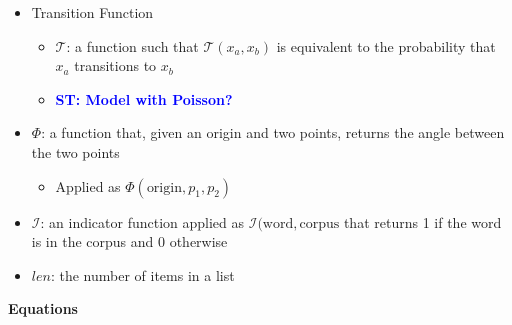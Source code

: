 \documentclass[letterpaper, 10 pt, conference]{ieeeconf}
\newcommand{\stnote}[1]{\textcolor{Blue}{\textbf{ST: #1}}}
\begin{document}
\begin{itemize}
\item{Transition Function}
	\begin{itemize}
	\item{$\mathcal{T}$: a function such that $\mathcal{T}(x_a, x_b)$ is equivalent to the probability that $x_a$ transitions to $x_b$}
	\item{\stnote{Model with Poisson?}}
	\end{itemize}

\item{$\Phi$: a function that, given an origin and two points, returns the angle between the two points}
	\begin{itemize}
	\item{Applied as $\Phi(\text{origin}, p_1, p_2)$}
	\end{itemize}
\item{$\mathcal{I}$: an indicator function applied as $\mathcal{I}(\text{word}, \text{corpus}$ that returns 1 if the word is in the corpus and 0 otherwise}
\item{$len$: the number of items in a list}
\end{itemize}
\textbf{Equations}
\end{document}
